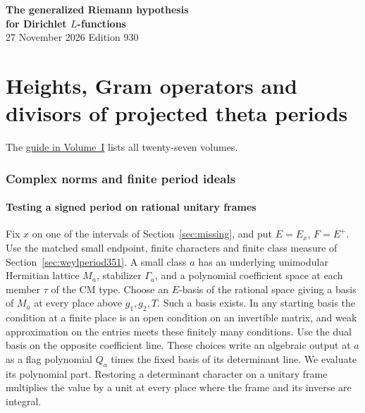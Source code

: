 \documentclass[a4paper,11pt]{article}
\theoremstyle{definition}
\theoremstyle{remark}
\numberwithin{equation}{section}
\begin{document}
\setcounter{part}{26}
\thispagestyle{plain}\begin{center}
{\LARGE\bfseries The generalized Riemann hypothesis\\[2pt]for Dirichlet \(L\)-functions}\\[6pt]
{\small 27 November 2026 \quad\textperiodcentered\quad Edition 930}\end{center}
\part{Heights, Gram operators and divisors of projected theta periods}\label{part:XXVII}
\begin{abstract}\noindent We compare finite period ideals with complex norms of the signed columns. Gram operators of the first lifts, marked determinants and terminal Fourier coefficients enter the height and common-divisor estimates.\end{abstract}
\setcounter{section}{140}
\noindent The \hyperref[seriesguide]{guide in Volume~I} lists all twenty-seven volumes.
\begingroup\small\setlength{\parskip}{0pt}\tableofcontents\endgroup
\clearpage

\section{Complex norms and finite period ideals}\label{nav:chapter-norms-and-period-ideals}\label{nav:volume-XXVII}

\subsection{Testing a signed period on rational unitary frames}
\label{sec:frameperiods446}

Fix \(x\) on one of the intervals of Section~\ref{sec:missing}, and put
\(E=E_x\), \(F=E^+\). Use the matched small endpoint, finite characters
and finite class measure of Section~\ref{sec:weylperiod351}.
A small class \(a\) has an underlying unimodular Hermitian lattice
\(M_a\), stabilizer \(\Gamma_a\), and a polynomial coefficient space at
each member \(\tau\) of the CM type. Choose an \(E\)-basis of the
rational space giving a basis of \(M_a\) at every place above
\(g_1,g_2,T\). Such a basis exists. In any starting basis the condition
at a finite place is an open condition on an invertible matrix, and
weak approximation on the entries meets these finitely many conditions.
Use the dual basis on the opposite coefficient line. These choices write
an algebraic output at \(a\) as a flag polynomial \(Q_a\) times the
fixed basis of its determinant line. We evaluate its polynomial part.
Restoring a determinant character on a unitary frame multiplies the
value by a unit at every place where the frame and its inverse are
integral.
\end{document}
